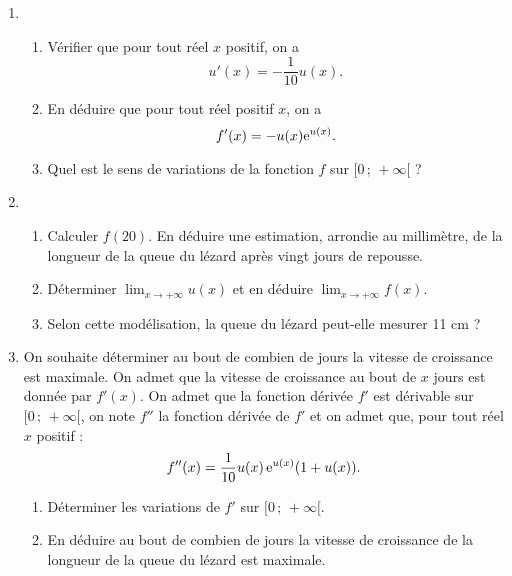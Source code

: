 \documentclass[11pt,fleqn, openany]{book} %
\begin{document}
\begin{exercise}[subtitle={(Amérique du Sud 2018)}]
\begin{enumerate}
\item \begin{enumerate}
\item Vérifier que pour tout réel $x$ positif, on a
\[u'(x)=-\dfrac{1}{10}u(x).\]
\item En déduire que pour tout réel positif $x$, on a 
\[f'(x)= -u(x) \mathrm{e}^{u(x)} .\]
\item Quel est le sens de variations de la fonction $f$ sur $[0\,;\,+\infty [$ ?\end{enumerate}
\vskip10pt
\item \begin{enumerate}
\item Calculer $f(20)$. En déduire une estimation, arrondie au millimètre, de la longueur de la queue du lézard après vingt jours de repousse.
\vskip5pt
\item Déterminer $\displaystyle \lim_{x\to + \infty} u(x)$ et en déduire $\displaystyle \lim_{x \to + \infty} f(x)$.
\vskip5pt
\item Selon cette modélisation, la queue du lézard peut-elle mesurer 11 cm ?\end{enumerate}
\vskip10pt
\item On souhaite déterminer au bout de combien de jours la vitesse de croissance est maximale.
On admet que la vitesse de croissance au bout de $x$ jours est donnée par $f'(x)$.
On admet que la fonction dérivée $f'$ est dérivable sur $[0\,;\,+\infty [$, on note $f''$ la fonction dérivée de $f'$ et on admet que, pour tout réel $x$ positif :
\[f''(x)=\dfrac{1}{10}u(x)\, \mathrm{e}^{u(x)}(1+u(x)).\]
 \begin{enumerate}
 \item Déterminer les variations de $f'$ sur $[0\,;\,+\infty [$.
 \vskip5pt
\item En déduire au bout de combien de jours la vitesse de croissance de la longueur de la queue du lézard est maximale.\end{enumerate}\end{enumerate}\end{exercise}
\end{document}
